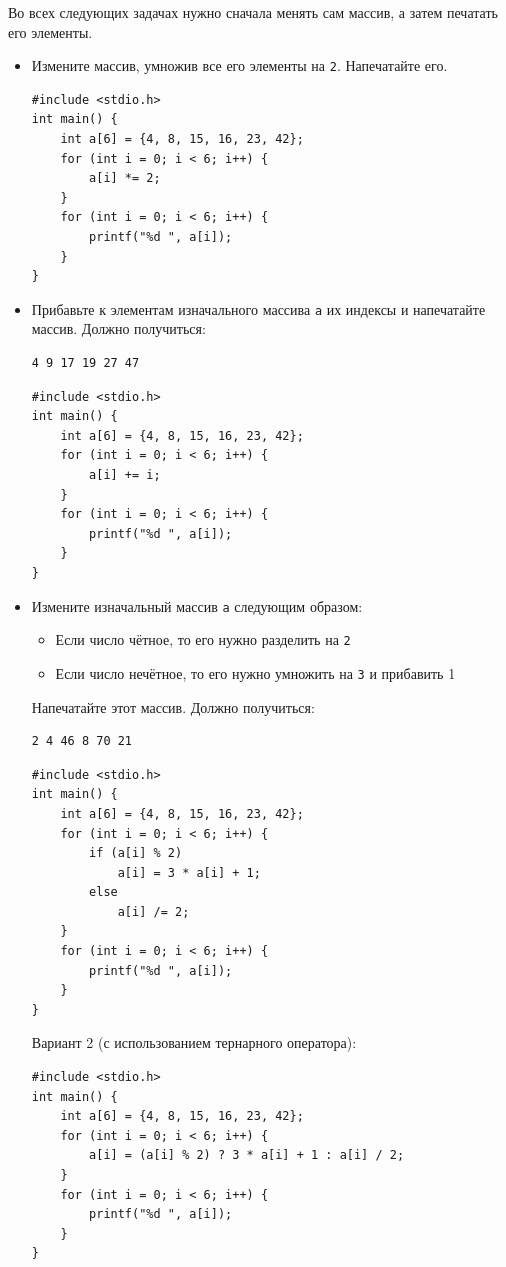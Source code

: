 \documentclass{article}
\begin{document}
\newpage
Во всех следующих задачах нужно сначала менять сам массив, а затем печатать его элементы.
\begin{itemize}
\item Измените массив, умножив все его элементы на \texttt{2}. Напечатайте его.
\begin{lstlisting}[backgroundcolor = \color{solcolor}]
#include <stdio.h>
int main() {
    int a[6] = {4, 8, 15, 16, 23, 42};
    for (int i = 0; i < 6; i++) {
        a[i] *= 2;
    }
    for (int i = 0; i < 6; i++) {
        printf("%d ", a[i]);
    }
}
\end{lstlisting}
\item Прибавьте к элементам изначального массива \texttt{a} их индексы и напечатайте массив. Должно получиться:
\begin{verbatim}
4 9 17 19 27 47
\end{verbatim}
\begin{lstlisting}[backgroundcolor = \color{solcolor}]
#include <stdio.h>
int main() {
    int a[6] = {4, 8, 15, 16, 23, 42};
    for (int i = 0; i < 6; i++) {
        a[i] += i;
    }
    for (int i = 0; i < 6; i++) {
        printf("%d ", a[i]);
    }
}
\end{lstlisting}
\item Измените изначальный массив \texttt{a} следующим образом:
\begin{itemize}
\item Если число чётное, то его нужно разделить на \texttt{2}
\item Если число нечётное, то его нужно умножить на \texttt{3} и прибавить 1
\end{itemize}
Напечатайте этот массив. Должно получиться:
\begin{verbatim}
2 4 46 8 70 21
\end{verbatim}
\begin{lstlisting}[backgroundcolor = \color{solcolor}]
#include <stdio.h>
int main() {
    int a[6] = {4, 8, 15, 16, 23, 42};
    for (int i = 0; i < 6; i++) {
        if (a[i] % 2)
            a[i] = 3 * a[i] + 1;
        else
            a[i] /= 2;
    }
    for (int i = 0; i < 6; i++) {
        printf("%d ", a[i]);
    }
}
\end{lstlisting}
Вариант 2 (с использованием тернарного оператора):
\begin{lstlisting}[backgroundcolor = \color{solcolor}]
#include <stdio.h>
int main() {
    int a[6] = {4, 8, 15, 16, 23, 42};
    for (int i = 0; i < 6; i++) {
    	a[i] = (a[i] % 2) ? 3 * a[i] + 1 : a[i] / 2;
    }
    for (int i = 0; i < 6; i++) {
        printf("%d ", a[i]);
    }
}
\end{lstlisting}
\end{itemize}
\end{document}
